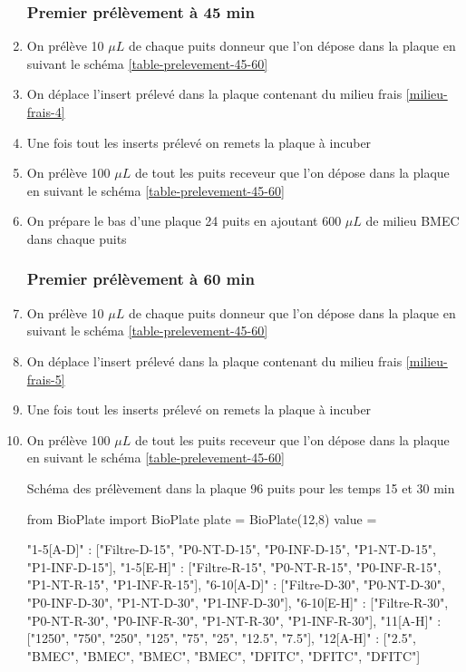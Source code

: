\begin{enumerate}
\subsubsection{Premier prélèvement à \textbf{45 min}}
\item On prélève 10 $\mu L$ de chaque puits donneur que l'on dépose dans la plaque en suivant le schéma \ref{table-prelevement-45-60}
\item On déplace l'insert prélevé dans la plaque contenant du milieu frais \ref{milieu-frais-4}
\item Une fois tout les inserts prélevé on remets la plaque à incuber
\item On prélève 100 $\mu L$ de tout les puits receveur que l'on dépose dans la plaque en suivant le schéma \ref{table-prelevement-45-60}
\item On prépare le bas d'une plaque 24 puits  en ajoutant 600 $\mu L$ de milieu BMEC dans chaque puits \label{milieu-frais-5}
\subsubsection{Premier prélèvement à \textbf{60 min}}
\item On prélève 10 $\mu L$ de chaque puits donneur que l'on dépose dans la plaque en suivant le schéma \ref{table-prelevement-45-60}
\item On déplace l'insert prélevé dans la plaque contenant du milieu frais \ref{milieu-frais-5}
\item Une fois tout les inserts prélevé on remets la plaque à incuber
\item On prélève 100 $\mu L$ de tout les puits receveur que l'on dépose dans la plaque en suivant le schéma \ref{table-prelevement-45-60}

\begin{table}[h]
\caption{Schéma des prélèvement dans la plaque 96 puits pour les temps 15 et 30 min}
\begin{pycode}

from BioPlate import BioPlate
plate = BioPlate(12,8)
value = {
    "1-5[A-D]" : ["Filtre-D-15", "P0-NT-D-15", "P0-INF-D-15", "P1-NT-D-15", "P1-INF-D-15"],
    "1-5[E-H]" : ["Filtre-R-15", "P0-NT-R-15", "P0-INF-R-15", "P1-NT-R-15", "P1-INF-R-15"],
    "6-10[A-D]" : ["Filtre-D-30", "P0-NT-D-30", "P0-INF-D-30", "P1-NT-D-30", "P1-INF-D-30"],
    "6-10[E-H]" : ["Filtre-R-30", "P0-NT-R-30", "P0-INF-R-30", "P1-NT-R-30", "P1-INF-R-30"],
    "11[A-H]" : ["1250", "750", "250", "125", "75", "25", "12.5", "7.5"],
    "12[A-H]" : ["2.5", "BMEC", "BMEC", "BMEC", "BMEC", "DFITC", "DFITC", "DFITC"]
    
}
\end{pycode}
\end{table}
\end{enumerate}
